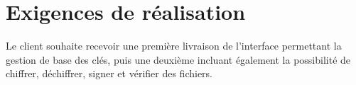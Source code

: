 \documentclass{../res/univ-projet}
\begin{document}
\section{Exigences de réalisation}

Le client souhaite recevoir une première livraison de l'interface permettant la gestion de base des clés, puis une deuxième incluant également la possibilité de chiffrer, déchiffrer, signer et vérifier des fichiers.

\end{document}
